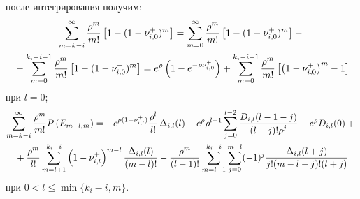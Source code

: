 после интегрирования получим:
\begin{multline*}
\sum\limits_{m=k-i}^\infty \displaystyle\frac{\displaystyle \rho^m\mathstrut}{\displaystyle m!\mathstrut} \left[ 1-(1-\nu^+_{i,0})^m\right]=
 \sum\limits_{m=0}^\infty \displaystyle\frac{\displaystyle \rho^m\mathstrut}{\displaystyle m!\mathstrut}\left[ 1-(1-\nu^+_{i,0})^m\right] -{}\\
 {}-
\sum\limits_{m=0}^{k_i-i-1} \displaystyle\frac{\displaystyle \rho^m\mathstrut}{\displaystyle m!\mathstrut}\left[ 1-(1-\nu^+_{i,0})^m\right]=
e^\rho \left(1-e^{-\rho \nu^+_{i,0}}\right) +
\sum\limits_{m=0}^{k_i-i-1} \displaystyle\frac{\displaystyle \rho^m\mathstrut}{\displaystyle m!\mathstrut}
\left[ \left(1 -\nu^+_{i,0}\right)^m-1\right]
\end{multline*}
при $l=0$;
\begin{multline}
\sum\limits_{m=k-i}^\infty \fr{\rho^m}{m!} P\left( E_{m-l,m}\right)
= -e^{\rho(1-\nu^+_{i,l})} \fr{\rho^l}{l!}\,\Delta_{i,l}(l)- 
e^\rho \rho^{l-1} \sum\limits_{j=0}^{l-2} \fr{D_{i,l}(l-1-j)}{(l-j)! \rho^j} -e^\rho D_{i,l}(0)+{}\\
{}+ \fr{\rho^m}{l!} \sum\limits_{m=l+1}^{k_i-i} \left( 1-\nu^+_{i,l}\right)^{m-l}
\fr{\Delta_{i,l}(l)}{(m-l)!}-
 \fr{\rho^m}{(l-1)!} \sum\limits_{m=l+1}^{k_i-i} \sum\limits_{j=0}^{m-l}
(-1)^j \fr{\Delta_{i,l}(l+j)}{j!(m-l-j)!(l+j)}
\label{e16-aga}
\end{multline}
  при $0<l\leq \min\{k_i-i,m\}$.
  
 

